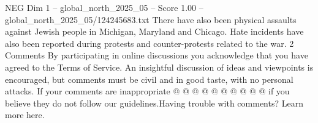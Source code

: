 \begin{textsample}{NEG Dim 1 – global\_north\_2025\_05 – Score 1.00 – global\_north\_2025\_05/124245683.txt}
There have also been physical assaults against Jewish people in Michigan, Maryland and Chicago.
Hate incidents have also been reported during protests and counter-protests related to the war. 2 Comments By participating in online discussions you acknowledge that you have agreed to the Terms of Service.
An insightful discussion of ideas and viewpoints is encouraged, but comments must be civil and in good taste, with no personal attacks.
If your comments are inappropriate @ @ @ @ @ @ @ @ @ @ if you believe they do not follow our guidelines.Having trouble with comments?
Learn more here.

\end{textsample}
